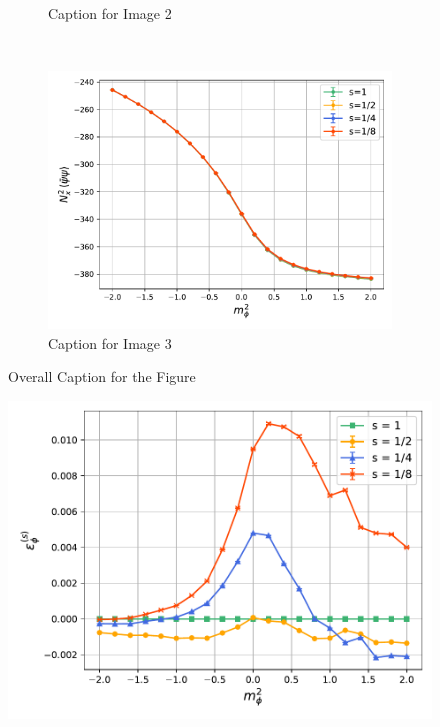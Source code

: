 \begin{figure}
\begin{subfigure}[b]{0.45\textwidth}
        \caption{Caption for Image 2}
    \end{subfigure}
    \\
    \vspace{10pt}
    \begin{subfigure}[b]{0.45\textwidth}
        \includegraphics[width=\textwidth]{figures/cooling/mass_scan/condensate.pdf}
        \caption{Caption for Image 3}
    \end{subfigure}
    \caption{Overall Caption for the Figure}
\end{figure}

\begin{figure}
    \centering
    \includegraphics[scale=0.45]{figures/cooling/mass_scan/deviation.pdf}
    \label{fig:cooling}
\end{figure}

